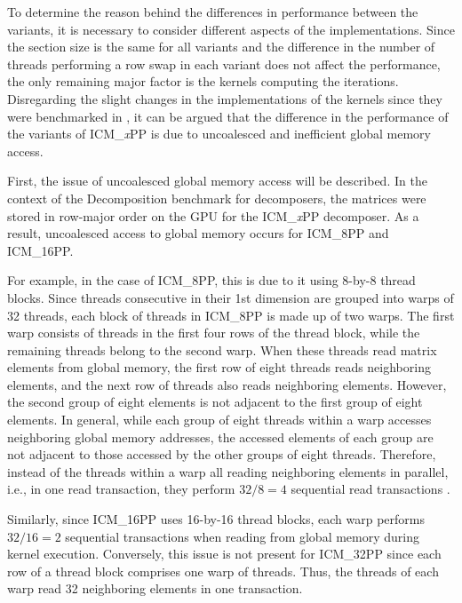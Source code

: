 To determine the reason behind the differences in performance between the variants, it is necessary to consider different aspects of the implementations.
Since the section size is the same for all variants and the difference in the number of threads performing a row swap in each variant does not affect the performance, the only remaining major factor is the kernels computing the iterations.\\
Disregarding the slight changes in the implementations of the kernels since they were benchmarked in  \cite{Cejka2022}, it can be argued that the difference in the performance of the variants of ICM\_\textit{x}PP is due to uncoalesced and inefficient global memory access.

First, the issue of uncoalesced global memory access will be described.
In the context of the Decomposition benchmark for decomposers, the matrices were stored in row-major order on the GPU for the ICM\_\textit{x}PP decomposer.
As a result, uncoalesced access to global memory occurs for ICM\_8PP and ICM\_16PP.

For example, in the case of ICM\_8PP, this is due to it using 8-by-8 thread blocks.
Since threads consecutive in their 1st dimension are grouped into warps of 32 threads, each block of threads in ICM\_8PP is made up of two warps.
The first warp consists of threads in the first four rows of the thread block, while the remaining threads belong to the second warp.
When these threads read matrix elements from global memory, the first row of eight threads reads neighboring elements, and the next row of threads also reads neighboring elements.
However, the second group of eight elements is not adjacent to the first group of eight elements.
In general, while each group of eight threads within a warp accesses neighboring global memory addresses, the accessed elements of each group are not adjacent to those accessed by the other groups of eight threads.
Therefore, instead of the threads within a warp all reading neighboring elements in parallel, i.e., in one read transaction, they perform $32/8 = 4$ sequential read transactions \cite{Cejka2022}.

Similarly, since ICM\_16PP uses 16-by-16 thread blocks, each warp performs $32/16 = 2$ sequential transactions when reading from global memory during kernel execution.
Conversely, this issue is not present for ICM\_32PP since each row of a thread block comprises one warp of threads.
Thus, the threads of each warp read 32 neighboring elements in one transaction.


